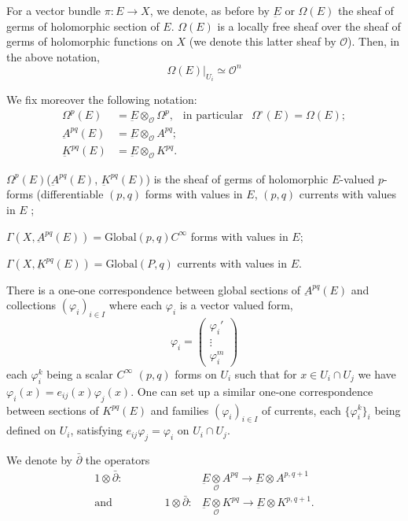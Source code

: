 \begin{enumerate}
For a vector bundle $\pi : E \rightarrow X$, we denote, as before by
$\underbar{E}$ or $\Omega(E)$ the sheaf of germs of holomorphic
section of $E$. $\Omega(E)$ 
is a locally free sheaf over the sheaf of germs of holomorphic
functions  on $X$ (we denote this latter sheaf by $\mathscr{O} $).  
Then, in the above notation,
$$ 
\Omega (E) \bigg|_{U_{i}}\simeq \mathscr{O}^{n} 
$$

We fix moreover the following notation:
\begin{equation*}
  \begin{aligned}
    \Omega^{p}(E) &= \underbar{E} \otimes_{\mathscr{O}} \Omega^{p},~~
    \text{ in particular } ~~\Omega^{\circ}(E) = \Omega(E) ;\\ 
    \underbar {A}^{pq}(E) & = \underbar{E} \otimes_{\mathscr{O}} A^{pq};\\
    \underbar {K}^{pq}(E) &= \underbar{E} \otimes_{\mathscr{O}} K^{pq}.
  \end{aligned}
\end{equation*}

$\Omega^{p}(E)$\pageoriginale (\resp $\underbar{A}^{pq}(E)$, \resp
$\underbar{K}^{pq}(E)$) 
is the sheaf of germs of holomorphic $E$-valued $p$-forms
(\resp differentiable $(p, q)$ forms with values in $E$, 
\resp $(p, q)$ currents with values in $E$ ;

$\Gamma(X,\underbar A^{pq}(E))=\text{Global} (p,q) C^{\infty}$
forms with values in $E$; 

$\Gamma(X,\underbar K^{pq}(E)) = \text{Global} (P,q)$ 
  currents with values in $E$.  

There is a one-one correspondence between global sections of
$\underbar{A}^{pq}(E)$ and collections $(\varphi_{i})_{i \in I}$ where
each $\varphi_{i}$ is a vector valued form,
$$
\varphi_{i}=
\begin{pmatrix}
  {\varphi_{i}'}\\ 
  {\vdots}\\
  {\varphi_{i}^{m}}
\end{pmatrix}
$$
each $\varphi_{i}^{k}$ being a scalar $C^{\infty}$ $(p,q)$ forms on
$U_{i}$ such that for $ x \in U_{i}\cap U_{j}$ we have
$\varphi_{i}(x)=e_{ij}(x) \varphi_{j}(x)$. 
One can set up a similar one-one correspondence between sections of
$K^{pq}(E)$ and families $(\varphi_{i})_{i \in I}$ of currents, each  
$\{\varphi_{i}^{k}\}_{i}$ being defined on $U_{i}$, satisfying 
$e_{ij} \varphi_{j} = \varphi_{i}$ on $U_{i}\cap U_{j}$. 

We denote by $\bar{\partial}$ the operators
\begin{align*}
  1 \otimes \bar{\partial}: & \underbar{E}
  \underset{\mathscr{O}}{\otimes}A^{pq} \longrightarrow
  \underbar{E}\otimes A^{p, q+ 1}\\
  \text{and}  \hspace{2cm} 1 \otimes \bar{\partial}: & \underbar{E}
  \underset{\mathscr{O}}{\otimes}K^{pq}  \longrightarrow
  \underbar{E}\otimes K^{p, q+1}.
\end{align*}


\end{enumerate}
